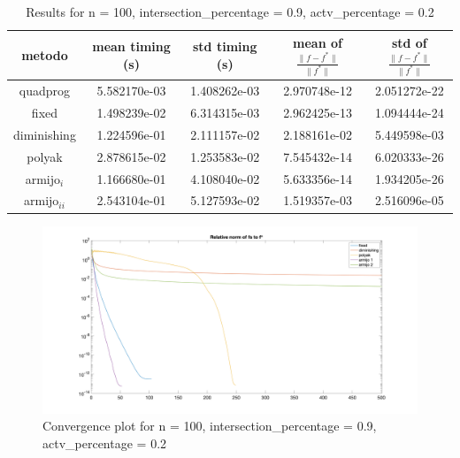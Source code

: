 
\begin{table}[H]
\setlength{\tabcolsep}{10pt} %
\renewcommand{\arraystretch}{1.2} %
\centering
\begin{tabular}{|ccccc|} 
\hline 
\multicolumn{1}{|c||}{metodo}   & \multicolumn{1}{c|}{mean timing (s)}    & \multicolumn{1}{c|}{std timing (s)} & \multicolumn{1}{c|}{mean of $\frac{\|f - f^*\|}{\|f^*\|}$}   & std of $\frac{\|f - f^*\|}{\|f^*\|}$ \\ \hline\hline 
\multicolumn{1}{|c||}{quadprog}       & \multicolumn{1}{c|}{5.582170e-03} & \multicolumn{1}{c|}{1.408262e-03}  & \multicolumn{1}{c|}{2.970748e-12} & 2.051272e-22  \\ \hline \hline
\multicolumn{1}{|c||}{fixed}       & \multicolumn{1}{c|}{1.498239e-02} & \multicolumn{1}{c|}{6.314315e-03}  & \multicolumn{1}{c|}{2.962425e-13} & 1.094444e-24  \\ \hline 
\multicolumn{1}{|c||}{diminishing}       & \multicolumn{1}{c|}{1.224596e-01} & \multicolumn{1}{c|}{2.111157e-02}  & \multicolumn{1}{c|}{2.188161e-02} & 5.449598e-03  \\ \hline 
\multicolumn{1}{|c||}{polyak}       & \multicolumn{1}{c|}{2.878615e-02} & \multicolumn{1}{c|}{1.253583e-02}  & \multicolumn{1}{c|}{7.545432e-14} & 6.020333e-26  \\ \hline 
\multicolumn{1}{|c||}{armijo$_{i}$}       & \multicolumn{1}{c|}{1.166680e-01} & \multicolumn{1}{c|}{4.108040e-02}  & \multicolumn{1}{c|}{5.633356e-14} & 1.934205e-26  \\ \hline 
\multicolumn{1}{|c||}{armijo$_{ii}$}       & \multicolumn{1}{c|}{2.543104e-01} & \multicolumn{1}{c|}{5.127593e-02}  & \multicolumn{1}{c|}{1.519357e-03} & 2.516096e-05  \\ \hline 
\end{tabular} 


\caption{Results for n = 100, intersection\_percentage = 0.9, actv\_percentage = 0.2}
\label{tab:100_zerodue_zeronove}
\end{table}


\begin{figure}[H]
\centering
    \includegraphics[width=20cm, center]{./plots/plot_100_zerodue_zeronove.png}
    \caption{Convergence plot for n = 100, intersection\_percentage = 0.9, actv\_percentage = 0.2}
    \label{fig:100_zerodue_zeronove}
\end{figure} 



